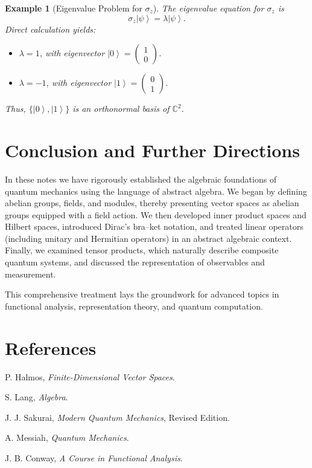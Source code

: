 \documentclass[11pt,oneside]{book}
\newtheorem{example}{Example}[chapter]
\theoremstyle{remark}
\renewcommand{\ket}[1]{\left| #1 \right\rangle}
\begin{document}
	\begin{example}[Eigenvalue Problem for $\sigma_z$]
		The eigenvalue equation for $\sigma_z$ is
		\[
		\sigma_z\ket{\psi} = \lambda\ket{\psi}.
		\]
		Direct calculation yields:
		\begin{itemize}
			\item $\lambda=1$, with eigenvector $\ket{0} = \begin{pmatrix} 1 \\ 0 \end{pmatrix}$.
			\item $\lambda=-1$, with eigenvector $\ket{1} = \begin{pmatrix} 0 \\ 1 \end{pmatrix}$.
		\end{itemize}
		Thus, $\{\ket{0}, \ket{1}\}$ is an orthonormal basis of $\mathbb{C}^2$.
	\end{example}
	
	\chapter{Conclusion and Further Directions}
	In these notes we have rigorously established the algebraic foundations of quantum mechanics using the language of abstract algebra. We began by defining abelian groups, fields, and modules, thereby presenting vector spaces as abelian groups equipped with a field action. We then developed inner product spaces and Hilbert spaces, introduced Dirac’s bra–ket notation, and treated linear operators (including unitary and Hermitian operators) in an abstract algebraic context. Finally, we examined tensor products, which naturally describe composite quantum systems, and discussed the representation of observables and measurement.
	
	This comprehensive treatment lays the groundwork for advanced topics in functional analysis, representation theory, and quantum computation.
	
	\backmatter
	\chapter{References}
	\begin{enumerate}[label={[\arabic*]}]
		\item P. Halmos, \emph{Finite-Dimensional Vector Spaces}.
		\item S. Lang, \emph{Algebra}.
		\item J. J. Sakurai, \emph{Modern Quantum Mechanics}, Revised Edition.
		\item A. Messiah, \emph{Quantum Mechanics}.
		\item J. B. Conway, \emph{A Course in Functional Analysis}.
	\end{enumerate}
	
\end{document}
